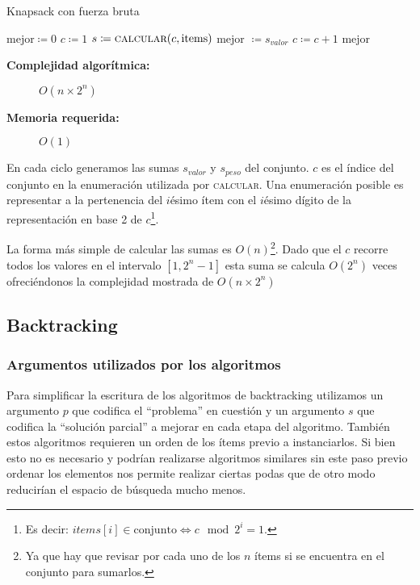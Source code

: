 \documentclass[fleqn, 11pt]{article}
\def\is{\coloneqq}
\begin{document}
\begin{algorithm}
\caption{Knapsack con fuerza bruta}
\begin{algorithmic}[1]
\Statex
{}
\State $\text{mejor} \is 0$
\State $c \is 1$
	\State $s \is \Call{calcular}{c, \text{items}}$
		\State mejor $\is s_{valor}$
	\EndIf
	\State $c \is c + 1$
\EndWhile
\State \Return mejor
\EndFunction
\end{algorithmic}
\begin{description}
	\item[\textbf{Complejidad algorítmica:}] $O(n \times 2^n)$
	\item[\textbf{Memoria requerida:}] $O(1)$
\end{description}
\end{algorithm}

En cada ciclo generamos las sumas $s_{valor}$ y $s_{peso}$ del conjunto. $c$ es
el índice del conjunto en la enumeración utilizada por \textsc{calcular}. Una
enumeración posible es representar a la pertenencia del $i$ésimo ítem con el
$i$ésimo dígito de la representación en base 2 de $c$\footnote{Es decir:
$items[i] \in \text{conjunto} \iff c \mod 2^i = 1$.}.

La forma más simple de calcular las sumas es $O(n)$\footnote{Ya que hay que
revisar por cada uno de los $n$ ítems si se encuentra en el conjunto para
sumarlos.}.  Dado que el $c$ recorre todos los valores en el intervalo $[1,2^n -
1]$ esta suma se calcula $O(2^n)$ veces ofreciéndonos la complejidad mostrada
de $O(n \times 2^n)$

\subsection{Backtracking}
\subsubsection{Argumentos utilizados por los algoritmos}

Para simplificar la escritura de los algoritmos de backtracking utilizamos un
argumento $p$ que codifica el ``problema'' en cuestión y un argumento $s$ que
codifica la ``solución parcial'' a mejorar en cada etapa del algoritmo. También
estos algoritmos requieren un orden de los ítems previo a instanciarlos. Si
bien esto no es necesario y podrían realizarse algoritmos similares sin este
paso previo ordenar los elementos nos permite realizar ciertas podas que de
otro modo reducirían el espacio de búsqueda mucho menos.
\end{document}

